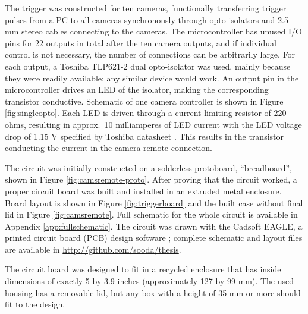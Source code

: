 The trigger was constructed for ten cameras, functionally transferring trigger pulses from a PC to all cameras synchronously through opto-isolators and 2.5 mm stereo cables connecting to the cameras.
The microcontroller has unused I/O pins for 22 outputs in total after the ten camera outputs, and if individual control is not necessary, the number of connections can be arbitrarily large.
For each output, a Toshiba TLP621-2 dual opto-isolator was used, mainly because they were readily available; any similar device would work.
An output pin in the microcontroller drives an LED of the isolator, making the corresponding transistor conductive.
Schematic of one camera controller is shown in Figure \ref{fig:singleopto}.
Each LED is driven through a current-limiting resistor of 220 ohms, resulting in approx.\ 10 milliamperes of LED current with the LED voltage drop of 1.15 V specified by Toshiba datasheet \cite{tlp621}.
This results in the transistor conducting the current in the camera remote connection.

The circuit was initially constructed on a solderless protoboard, ``breadboard'', shown in Figure \ref{fig:camsremote-proto}.
After proving that the circuit worked, a proper circuit board was built and installed in an extruded metal enclosure.
Board layout is shown in Figure \ref{fig:triggerboard} and the built case without final lid in Figure \ref{fig:camsremote}.
Full schematic for the whole circuit is available in Appendix \ref{app:fullschematic}.
The circuit was drawn with the Cadsoft EAGLE, a printed circuit board (PCB) design software \cite{eaglepcb}; complete schematic and layout files are available in \url {http://github.com/sooda/thesis}.

The circuit board was designed to fit in a recycled enclosure that has inside dimensions of exactly 5 by 3.9 inches (approximately 127 by 99 mm).
The used housing has a removable lid, but any box with a height of 35 mm or more should fit to the design.



